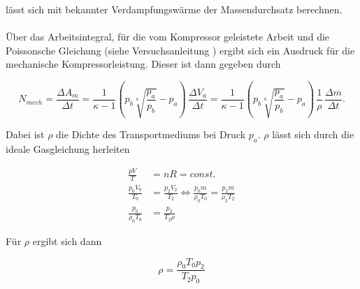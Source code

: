 lässt sich mit bekannter Verdampfungswärme der Massendurchsatz berechnen.\\
\\
Über das Arbeitsintegral, für die vom Kompressor geleistete Arbeit und die Poissonsche Gleichung (siehe Versuchsanleitung \cite{versuchsbeschreibung})
ergibt sich ein Ausdruck für die mechanische Kompressorleistung. Dieser ist dann gegeben durch

\begin{equation}
    \label{mechLeistung}
    N_{mech} = \frac{ΔA_m}{Δt} = \frac{1}{κ - 1}\left(p_b\sqrt[κ]{\frac{p_a}{p_b}} - p_a\right) \, \frac{ΔV_a}{Δt} 
    = \frac{1}{κ - 1}\left(p_b\sqrt[κ]{\frac{p_a}{p_b}} - p_a\right)\,\frac{1}{ρ}\,\frac{Δm}{Δt}.
\end{equation}

Dabei ist $\rho$ die Dichte des Transportmediums bei Druck $p_a$. $\rho$ lässt sich durch die ideale Gasgleichung herleiten

\begin{align}
    \frac{pV}{T} &= nR = const.\\
    \frac{p_0V_0}{T_0} &= \frac{p_2V_2}{T_2} \Leftrightarrow \frac{p_0m}{ρ_0T_0} = \frac{p_2m}{ρ_2T_2}\\
    \frac{p_0}{ρ_0T_0} &= \frac{p_2}{T_2ρ} 
\end{align}

Für $\rho$ ergibt sich dann

\begin{equation}\label{eqn:roh}
    ρ = \frac{ρ_0T_0p_2}{T_2p_0}
\end{equation}
